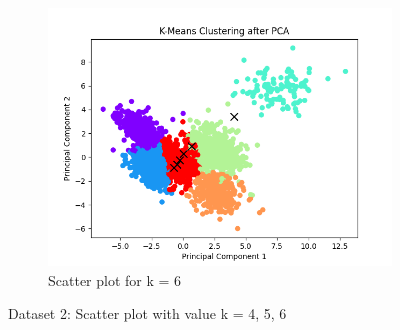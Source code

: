\documentclass[12pt]{report}
\begin{document}
\begin{figure}[H]
\begin{subfigure}{.5\textwidth}
			\includegraphics[width=.9\linewidth]{../K-means/Output/Dataset2/scatterPlot_k=6.png}
			\caption{Scatter plot for k = 6}
			\label{Dataset2Scatterplotk6}
		\end{subfigure}
		\caption{Dataset 2: Scatter plot with value k = 4, 5, 6}
		\label{Dataset2Scatterplot456}
	\end{figure}
\end{document}
